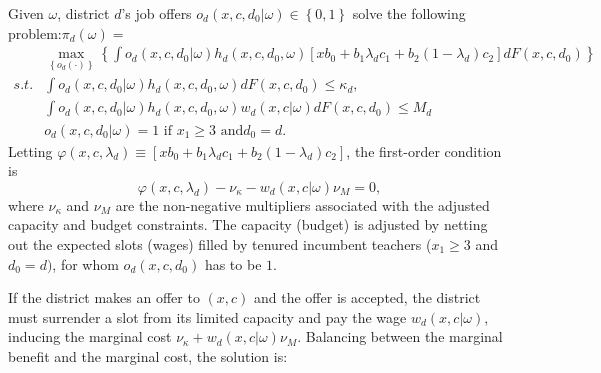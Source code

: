 \documentclass[notitlepage,12pt]{article}%
\begin{document}
Given $\omega$, district $d$'s job offers $o_{d}\left(  x,c,d_{0}%
|\omega\right)  \in\left\{  0,1\right\}  $ solve the following
problem:\newline$\pi_{d}\left(  \omega\right)  =$
\begin{align}
&  \max_{\left\{  o_{d}\left(  \cdot\right)  \right\}  }\left\{  \int
o_{d}\left(  x,c,d_{0}|\omega\right)  h_{d}\left(  x,c,d_{0},\omega\right)
\left[  xb_{0}+b_{1}\lambda_{d}c_{1}+b_{2}\left(  1-\lambda_{d}\right)
c_{2}\right]  dF\left(  x,c,d_{0}\right)  \right\} \\
s.t.  &  \int o_{d}\left(  x,c,d_{0}|\omega\right)  h_{d}\left(
x,c,d_{0},\omega\right)  dF\left(  x,c,d_{0}\right)  \leq\kappa_{d}%
,\nonumber\\
&  \int o_{d}\left(  x,c,d_{0}|\omega\right)  h_{d}\left(  x,c,d_{0}%
,\omega\right)  w_{d}\left(  x,c|\omega\right)  dF\left(  x,c,d_{0}\right)
\leq M_{d}\nonumber\\
&  o_{d}\left(  x,c,d_{0}|\omega\right)  =1\text{ if }x_{1}\geq3\text{ and
}d_{0}=d.\nonumber
\end{align}
Letting $\varphi\left(  x,c,\lambda_{d}\right)  \equiv\left[  xb_{0}%
+b_{1}\lambda_{d}c_{1}+b_{2}\left(  1-\lambda_{d}\right)  c_{2}\right]  $, the
first-order condition is%
\[
\varphi\left(  x,c,\lambda_{d}\right)  -\nu_{\kappa}-w_{d}\left(
x,c|\omega\right)  \nu_{M}=0,
\]
where $\nu_{\kappa}$ and $\nu_{M}$ are the non-negative multipliers associated
with the adjusted capacity and budget constraints. The capacity (budget) is
adjusted by netting out the expected slots (wages) filled by tenured incumbent
teachers ($x_{1}\geq3$ and $d_{0}=d)$, for whom $o_{d}\left(  x,c,d_{0}%
\right)  $ has to be $1.$

If the district makes an offer to $\left(  x,c\right)  $ and the offer is
accepted, the district must surrender a slot from its limited capacity and pay
the wage $w_{d}\left(  x,c|\omega\right)  $, inducing the marginal cost
$\nu_{\kappa}+w_{d}\left(  x,c|\omega\right)  \nu_{M}$. Balancing between the
marginal benefit and the marginal cost, the solution is:%
\end{document}
